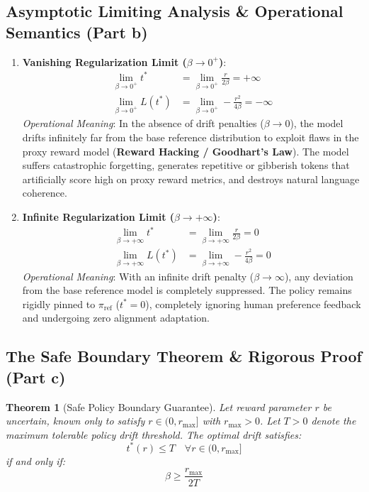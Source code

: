 \documentclass[11pt,a4paper]{article}
\theoremstyle{definition}
\theoremstyle{plain}
\newtheorem{theorem}{Theorem}[section]
\theoremstyle{remark}
\begin{document}
\subsection{Asymptotic Limiting Analysis \& Operational Semantics (Part b)}
\begin{enumerate}
    \item \textbf{Vanishing Regularization Limit ($\beta \to 0^+$)}:
    \begin{align}
    \lim_{\beta \to 0^+} t^* &= \lim_{\beta \to 0^+} \frac{r}{2\beta} = +\infty \\
    \lim_{\beta \to 0^+} L(t^*) &= \lim_{\beta \to 0^+} -\frac{r^2}{4\beta} = -\infty
    \end{align}
    \textit{Operational Meaning}: In the absence of drift penalties ($\beta \to 0$), the model drifts infinitely far from the base reference distribution to exploit flaws in the proxy reward model (\textbf{Reward Hacking / Goodhart's Law}). The model suffers catastrophic forgetting, generates repetitive or gibberish tokens that artificially score high on proxy reward metrics, and destroys natural language coherence.
    
    \item \textbf{Infinite Regularization Limit ($\beta \to +\infty$)}:
    \begin{align}
    \lim_{\beta \to +\infty} t^* &= \lim_{\beta \to +\infty} \frac{r}{2\beta} = 0 \\
    \lim_{\beta \to +\infty} L(t^*) &= \lim_{\beta \to +\infty} -\frac{r^2}{4\beta} = 0
    \end{align}
    \textit{Operational Meaning}: With an infinite drift penalty ($\beta \to \infty$), any deviation from the base reference model is completely suppressed. The policy remains rigidly pinned to $\pi_{\text{ref}}$ ($t^* = 0$), completely ignoring human preference feedback and undergoing zero alignment adaptation.
\end{enumerate}

\subsection{The Safe Boundary Theorem \& Rigorous Proof (Part c)}
\begin{theorem}[Safe Policy Boundary Guarantee]
Let reward parameter $r$ be uncertain, known only to satisfy $r \in (0, r_{\max}]$ with $r_{\max} > 0$. Let $T > 0$ denote the maximum tolerable policy drift threshold. The optimal drift satisfies:
\begin{equation}
t^*(r) \le T \quad \forall r \in (0, r_{\max}]
\end{equation}
if and only if:
\begin{equation}
\beta \ge \frac{r_{\max}}{2T}
\label{eq:safe_boundary}
\end{equation}
\end{theorem}
\end{document}

